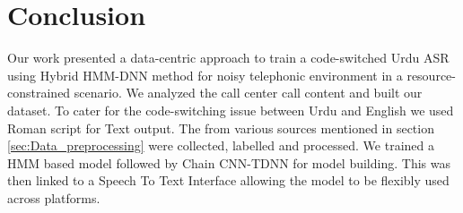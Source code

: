 \chapter{Conclusion} %
\label{cha:discussion_conclusion}






Our work presented a data-centric approach to train a code-switched Urdu ASR using Hybrid HMM-DNN method for noisy telephonic environment in a resource-constrained scenario. We analyzed the call center call content and built our dataset. To cater for the code-switching issue between Urdu and English we used Roman script for Text output. The from various sources mentioned in section \ref{sec:Data_preprocessing} were collected, labelled and processed. We trained a HMM based model followed by Chain CNN-TDNN for model building. This was then linked to a Speech To Text Interface allowing the model to be flexibly used across platforms.

